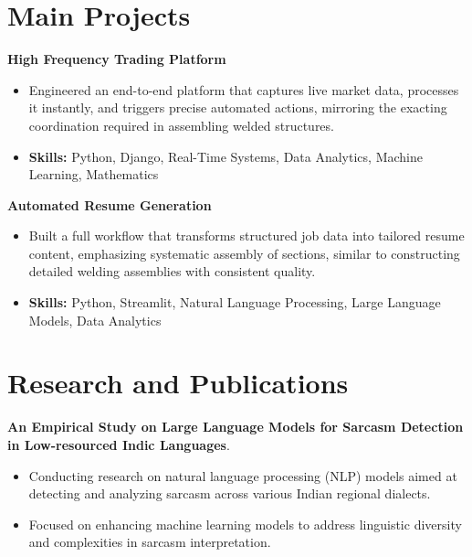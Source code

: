 \documentclass[a4paper,11pt]{article}
\begin{document}
\section{\textbf{Main Projects}}

\vspace{1mm}
  \textbf{High Frequency Trading Platform  }
\vspace{-1.5mm} %
\begin{itemize}
  \item Engineered an end-to-end platform that captures live market data, processes it instantly, and triggers precise automated actions, mirroring the exacting coordination required in assembling welded structures.
\vspace{-3mm}
  \item \textbf{Skills:} Python, Django, Real-Time Systems, Data Analytics, Machine Learning, Mathematics
\end{itemize}


\vspace{1mm}
   \textbf{Automated Resume Generation }
\vspace{-1.5mm} %
\begin{itemize}
  \item Built a full workflow that transforms structured job data into tailored resume content, emphasizing systematic assembly of sections, similar to constructing detailed welding assemblies with consistent quality.
\vspace{-3mm}
  \item \textbf{Skills:} Python, Streamlit, Natural Language Processing, Large Language Models, Data Analytics
\end{itemize}



\section{\textbf{Research and Publications} \hfill }
\vspace{1mm}
  \textbf{An Empirical Study on Large Language Models for Sarcasm Detection in Low-resourced Indic Languages}.
\vspace{-1mm} %
\begin{itemize}
  \item Conducting research on natural language processing (NLP) models aimed at detecting and analyzing sarcasm across various Indian regional dialects.
\vspace{-3mm}
  \item Focused on enhancing machine learning models to address linguistic diversity and complexities in sarcasm interpretation.
\end{itemize}
\end{document}
